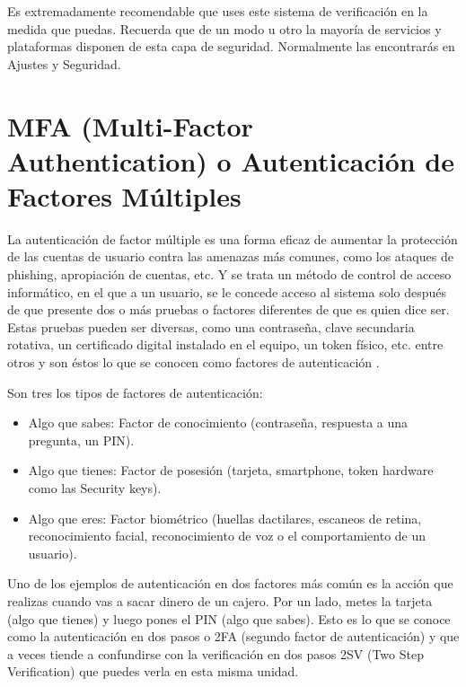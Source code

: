 \documentclass[
  a4paper,
  openany]{book}
\begin{document}
Es extremadamente recomendable que uses este sistema de verificación en la medida que puedas. Recuerda que de un modo u otro la mayoría de servicios y plataformas disponen de esta capa de seguridad. Normalmente las encontrarás en Ajustes y Seguridad.

\hypertarget{mfa-multi-factor-authentication-o-autenticaciuxf3n-de-factores-muxfaltiples}{%
\section{MFA (Multi-Factor Authentication) o Autenticación de Factores Múltiples}\label{mfa-multi-factor-authentication-o-autenticaciuxf3n-de-factores-muxfaltiples}}

La autenticación de factor múltiple es una forma eficaz de aumentar la protección de las cuentas de usuario contra las amenazas más comunes, como los ataques de phishing, apropiación de cuentas, etc. Y se trata un método de control de acceso informático, en el que a un usuario, se le concede acceso al sistema solo después de que presente dos o más pruebas o factores diferentes de que es quien dice ser. Estas pruebas pueden ser diversas, como una contraseña, clave secundaria rotativa, un certificado digital instalado en el equipo, un token físico, etc. entre otros y son éstos lo que se conocen como factores de autenticación \citep{WIKI-multiple-factor}.

Son tres los tipos de factores de autenticación:

\begin{itemize}
\item
  Algo que sabes: Factor de conocimiento (contraseña, respuesta a una pregunta, un PIN).
\item
  Algo que tienes: Factor de posesión (tarjeta, smartphone, token hardware como las Security keys).
\item
  Algo que eres: Factor biométrico (huellas dactilares, escaneos de retina, reconocimiento facial, reconocimiento de voz o el comportamiento de un usuario).
\end{itemize}

Uno de los ejemplos de autenticación en dos factores más común es la acción que realizas cuando vas a sacar dinero de un cajero. Por un lado, metes la tarjeta (algo que tienes) y luego pones el PIN (algo que sabes). Esto es lo que se conoce como la autenticación en dos pasos o 2FA (segundo factor de autenticación) y que a veces tiende a confundirse con la verificación en dos pasos 2SV (Two Step Verification) que puedes verla en esta misma unidad.
\end{document}
